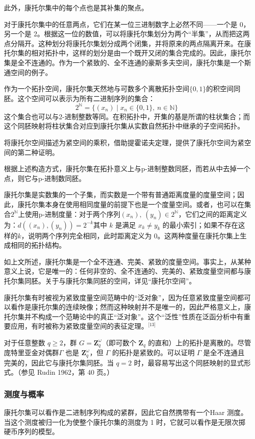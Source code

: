 此外，康托尔集中的每个点也是其补集的聚点。

对于康托尔集中的任意两点，它们在某一位三进制数字上必然不同——一个是 0，另一个是 2。根据这一位的数值，可以将康托尔集划分为两个“半集”，从而把这两点分隔开。这种划分将康托尔集划分成两个闭集，并将原来的两点隔离开来。在康托尔集的相对拓扑中，这样的划分是由一个既开又闭的集合完成的。因此，康托尔集是全不连通的。作为一个紧致的、全不连通的豪斯多夫空间，康托尔集是一个斯通空间的例子。

作为一个拓扑空间，康托尔集天然地与可数多个离散拓扑空间$\{0,1\}$的积空间同胚。这个空间可以表示为所有二进制序列的集合：
$$
2^{\mathbb{N}} = \{(x_n) \mid x_n \in \{0,1\},\ n \in \mathbb{N} \}~
$$
这个集合也可以与2-进制整数等同。在积拓扑中，开集的基是所谓的柱状集合；而这个同胚映射将柱状集合对应到康托尔集从实数自然拓扑中继承的子空间拓扑。

将康托尔空间描述为紧空间的乘积，借助提霍诺夫定理，提供了康托尔空间为紧空间的第二种证明。

根据上述构造方式，康托尔集在拓扑意义上与p-进制整数同胚，而若从中去掉一个点，则它与p-进制数同胚。

康托尔集是实数集的一个子集，而实数是一个带有普通距离度量的度量空间；因此，康托尔集本身在使用相同度量的前提下也是一个度量空间。或者，也可以在集合$2^{\mathbb{N}}$上使用p-进制度量：对于两个序列$(x_n),\ (y_n) \in 2^{\mathbb{N}}$，它们之间的距离定义为：$d((x_n), (y_n)) = 2^{-k}$其中 $k$ 是满足 $x_k \ne y_k$ 的最小索引；如果不存在这样的$k$，说明两个序列完全相同，此时距离定义为 0。这两种度量在康托尔集上生成相同的拓扑结构。

如上文所述，康托尔集是一个全不连通、完美、紧致的度量空间。事实上，从某种意义上说，它是唯一的：任何非空的、全不连通的、完美的、紧致度量空间都与康托尔集同胚。关于与康托尔集同胚的空间，详见“康托尔空间”。

康托尔集有时被视为紧致度量空间范畴中的“泛对象”，因为任意紧致度量空间都可以看作是康托尔集的连续映像；然而这种映射并不是唯一的，因此严格意义上，康托尔集并不构成一个范畴论中的真正“泛对象”。这个“泛性”性质在泛函分析中有重要应用，有时被称为紧致度量空间的表征定理。\(^\text{[13]}\)

对于任意整数 $q \geq 2$，群 $G = \mathbf{Z}_q^{\omega}$（即可数个 $\mathbf{Z}_q$ 的直和）上的拓扑是离散的。尽管庞特里亚金对偶群$\Gamma$ 也是 $\mathbf{Z}_q^{\omega}$，但 $\Gamma$ 的拓扑是紧致的。可以证明 $\Gamma$ 是全不连通且完美的，因此它与康托尔集同胚。当 $q = 2$ 时，最容易写出这个同胚映射的显式形式。（参见 Rudin 1962，第 40 页。）
\subsubsection{测度与概率}
康托尔集可以看作是二进制序列构成的紧群，因此它自然携带有一个Haar 测度。当这个测度被归一化为使整个康托尔集的测度为 1 时，它就可以看作是无限次掷硬币序列的模型。

